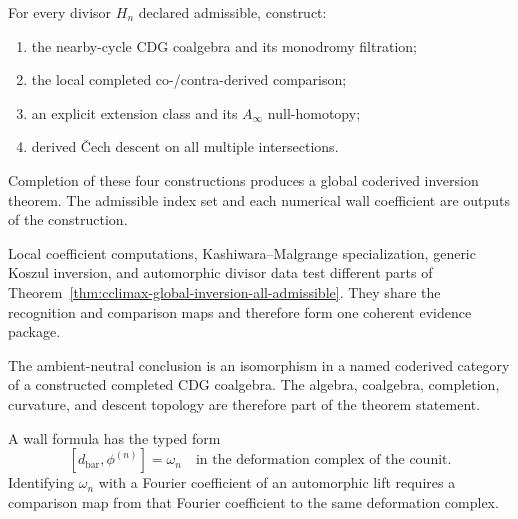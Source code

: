 \begin{theorem}
\label{thm:cclimax-global-inversion-all-admissible}
\ClaimStatusOpen
For every divisor \(H_n\) declared admissible, construct:
\begin{enumerate}[label=\textup{(\roman*)}]
\item the nearby-cycle CDG coalgebra and its monodromy filtration;
\item the local completed co-/contra-derived comparison;
\item an explicit extension class and its \(A_\infty\) null-homotopy;
\item derived Čech descent on all multiple intersections.
\end{enumerate}
Completion of these four constructions produces a global coderived inversion
theorem.  The admissible index set and each numerical wall coefficient
are outputs of the construction.
\end{theorem}

\begin{remark}
\label{rem:cclimax-four-verification-paths}
Local coefficient computations, Kashiwara--Malgrange specialization,
generic Koszul inversion, and automorphic divisor data test different
parts of Theorem~\ref{thm:cclimax-global-inversion-all-admissible}.
They share the recognition and comparison maps and therefore form one
coherent evidence package.
\end{remark}

\begin{remark}
\label{rem:cclimax-constitutional-ambient-neutral-theoremB}
The ambient-neutral conclusion is an isomorphism in a named coderived
category of a constructed completed CDG coalgebra.  The algebra,
coalgebra, completion, curvature, and descent topology are therefore
part of the theorem statement.
\end{remark}

\begin{remark}
\label{rem:cclimax-extension-obstruction-governing-equation}
\ClaimStatusOpen
A wall formula has the typed form
\[
 [d_{\mathrm{bar}},\phi^{(n)}]
 =
 \omega_n
 \quad\text{in the deformation complex of the counit}.
\]
Identifying \(\omega_n\) with a Fourier coefficient of an automorphic
lift requires a comparison map from that Fourier coefficient to the
same deformation complex.
\end{remark}

